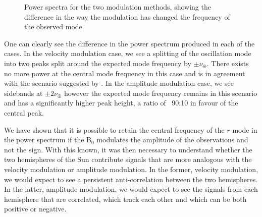 \begin{figure}[!ht]
	\centering
	\qquad
	\caption{Power spectra for the two modulation methods, showing the difference in the way the modulation has changed the frequency of the observed mode.}  \label{fig:modulation_PSDs}
\end{figure}

One can clearly see the difference in the power spectrum produced in each of the cases. In the velocity modulation case, we see a splitting of the oscillation mode into two peaks split around the expected mode frequency by $\pm \nu_{\oplus}$. There exists no more power at the central mode frequency in this case and is in agreement with the scenario suggested by \citet{lanza_sectoral_2019}. In the amplitude modulation case, we see sidebands at $\pm 2\nu_{\oplus}$ however the expected mode frequency remains in this scenario and has a significantly higher peak height, a ratio of ~90:10 in favour of the central peak.

We have shown that it is possible to retain the central frequency of the $r$ mode in the power spectrum  if the B$_0$ modulates the amplitude of the observations and not the sign. With this known, it was then necessary to understand whether the two hemispheres of the Sun contribute signals that are more analogous with the velocity modulation or amplitude modulation. In the former, velocity modulation, we would expect to see a persistent anti-correlation between the two hemispheres. In the latter, amplitude modulation, we would expect to see the signals from each hemisphere that are correlated, which track each other and which can be both positive or negative.

